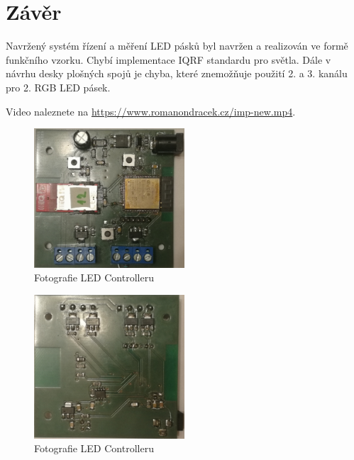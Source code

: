 \documentclass[12pt]{article}
\begin{document}
	\section{Závěr}
	
	Navržený systém řízení a měření LED pásků byl navržen a realizován ve formě funkčního vzorku. Chybí implementace IQRF standardu pro světla. Dále v návrhu desky plošných spojů je chyba, které znemožňuje použití 2. a 3. kanálu pro 2. RGB LED pásek.
	
	Video naleznete na \url{https://www.romanondracek.cz/imp-new.mp4}.	
	
      \begin{figure}[!ht]
      	\centering
        \includegraphics[width = 0.5\textwidth]{img/pcb-front.jpg}
        \caption{Fotografie LED Controlleru}
      \end{figure}	
      
      \begin{figure}[!ht]
      	\centering
        \includegraphics[width = 0.5\textwidth]{img/pcb-back.jpg}
        \caption{Fotografie LED Controlleru}
      \end{figure}
	
	\newpage
	
\end{document}
